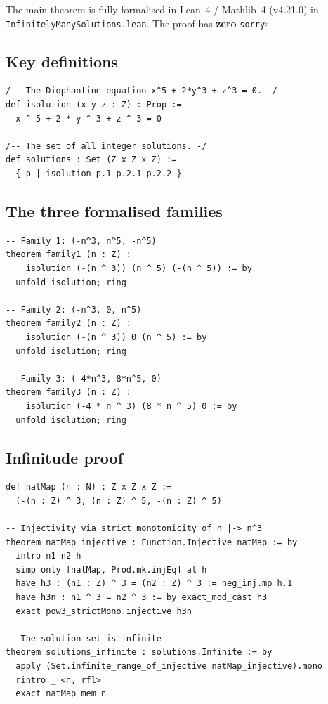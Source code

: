 \documentclass[12pt,a4paper]{article}
\theoremstyle{definition}
\begin{document}
The main theorem is fully formalised in Lean~4 / Mathlib~4 (v4.21.0) in
\texttt{InfinitelyManySolutions.lean}.  The proof has \textbf{zero} \texttt{sorry}s.

\subsection{Key definitions}

\begin{lstlisting}[language=Lean4]
/-- The Diophantine equation x^5 + 2*y^3 + z^3 = 0. -/
def isolution (x y z : Z) : Prop :=
  x ^ 5 + 2 * y ^ 3 + z ^ 3 = 0

/-- The set of all integer solutions. -/
def solutions : Set (Z x Z x Z) :=
  { p | isolution p.1 p.2.1 p.2.2 }
\end{lstlisting}

\subsection{The three formalised families}

\begin{lstlisting}[language=Lean4]
-- Family 1: (-n^3, n^5, -n^5)
theorem family1 (n : Z) :
    isolution (-(n ^ 3)) (n ^ 5) (-(n ^ 5)) := by
  unfold isolution; ring

-- Family 2: (-n^3, 0, n^5)
theorem family2 (n : Z) :
    isolution (-(n ^ 3)) 0 (n ^ 5) := by
  unfold isolution; ring

-- Family 3: (-4*n^3, 8*n^5, 0)
theorem family3 (n : Z) :
    isolution (-4 * n ^ 3) (8 * n ^ 5) 0 := by
  unfold isolution; ring
\end{lstlisting}

\subsection{Infinitude proof}

\begin{lstlisting}[language=Lean4]
def natMap (n : N) : Z x Z x Z :=
  (-(n : Z) ^ 3, (n : Z) ^ 5, -(n : Z) ^ 5)

-- Injectivity via strict monotonicity of n |-> n^3
theorem natMap_injective : Function.Injective natMap := by
  intro n1 n2 h
  simp only [natMap, Prod.mk.injEq] at h
  have h3 : (n1 : Z) ^ 3 = (n2 : Z) ^ 3 := neg_inj.mp h.1
  have h3n : n1 ^ 3 = n2 ^ 3 := by exact_mod_cast h3
  exact pow3_strictMono.injective h3n

-- The solution set is infinite
theorem solutions_infinite : solutions.Infinite := by
  apply (Set.infinite_range_of_injective natMap_injective).mono
  rintro _ <n, rfl>
  exact natMap_mem n
\end{lstlisting}
\end{document}
